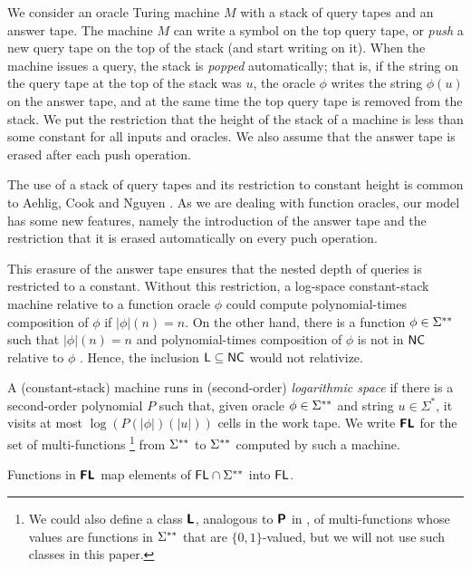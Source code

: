 \documentclass[envcountsect,envcountsame,orivec,oribibl]{llncs}
\begin{document}
We consider an oracle Turing machine $M$ 
with a stack of query tapes and an answer tape.
The machine $M$ can write a symbol on the top query tape, or 
\emph{push} a new query tape on the top of the stack (and start writing on it).
When the machine issues a query, the stack is \emph{popped} automatically; 
that is, 
if the string on the query tape at the top of the stack was $u$, 
the oracle $\phi$ writes the string $\phi (u)$ on the answer tape, 
and at the same time the top query tape is removed from the stack. 
We put the restriction that the height of the stack of a machine is less than 
some constant for all inputs and oracles.
We also assume that 
the answer tape is erased after each push operation.

The use of a stack of query tapes and its restriction to constant height 
is common to Aehlig, Cook and Nguyen \cite{aehlig2007relativizing}. 
As we are dealing with function oracles, 
our model has some new features, namely 
the introduction of the answer tape and 
the restriction that it is erased automatically on every puch operation. 

This erasure of the answer tape
ensures that the nested depth of queries is restricted to a constant.
Without this restriction, a log-space constant-stack machine relative to 
a function oracle $\phi$ could compute polynomial-times composition
of $\phi$ if $|\phi|(n) = n$.
On the other hand, there is a function $\phi \in \Sigma ^{**}$ such that $|\phi|(n) = n$
and polynomial-times composition of $\phi$ is not in $\mathsf{NC}$ relative to $\phi$ \cite{aehlig2007relativizing}.
Hence, the inclusion $\mathsf{L} \subseteq \mathsf{NC}$ would not relativize.

\begin{definition}
 A (constant-stack) machine runs in (second-order) \emph{logarithmic space}
 if there is a second-order polynomial $P$ such that, 
 given oracle $\phi \in \Sigma ^{**}$ and string $u \in \Sigma^*$, 
 it visits at most $\log(P(|\phi|)(|u|))$ cells
 in the work tape.
 We write $\text{\bfseries \sffamily \upshape FL}$ for the set of multi-functions%
\footnote{%
We could also define a class $\text{\bfseries \sffamily \upshape L}$, 
analogous to $\text{\bfseries \sffamily \upshape P}$ in \cite{kawamura2012complexity}, 
of multi-functions whose values are functions in $\Sigma ^{**}$ 
that are $\{0, 1\}$-valued, 
but we will not use such classes in this paper. 
}
 from $\Sigma ^{**}$ to $\Sigma ^{**}$ 
 computed by such a machine.
\end{definition}

\begin{lemma}
\label{lemma:Ltwo-maps-L-to-L}
 Functions in $\text{\bfseries \sffamily \upshape FL}$ map 
 elements of $\mathsf{FL} \cap \Sigma ^{**}$
 into $\mathsf{FL}$.
\end{lemma}
\end{document}
